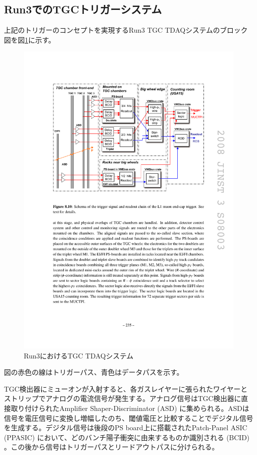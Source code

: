     \subsection{Run3でのTGCトリガーシステム}
上記のトリガーのコンセプトを実現するRun3 TGC TDAQシステムのブロック図を図\ref{TGC_run3tdaq}に示す。

\begin{figure} 
\centering
\includegraphics[width=16cm]{fig/Intro/TGC_run3tdaq.pdf}
\caption[Run3におけるTGC TDAQシステム]{Run3におけるTGC TDAQシステム}
\label{TGC_run3tdaq}
\end{figure}

図の赤色の線はトリガーパス、青色はデータパスを示す。

TGC検出器にミューオンが入射すると、各ガスレイヤーに張られたワイヤーとストリップでアナログの電流信号が発生する。アナログ信号はTGC検出器に直接取り付けられたAmplifier Shaper-Discriminator (ASD) に集められる。ASDは信号を電圧信号に変換し増幅したのち、閾値電圧と比較することでデジタル信号を生成する。デジタル信号は後段のPS board上に搭載されたPatch-Panel ASIC (PPASIC) において、どのバンチ陽子衝突に由来するものか識別される (BCID) 。この後から信号はトリガーパスとリードアウトパスに分けられる。

